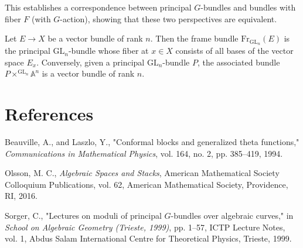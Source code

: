 \documentclass[12pt]{article}
\begin{document}
This establishes a correspondence between principal $G$-bundles and bundles with fiber $F$ (with $G$-action), showing that these two perspectives are equivalent.

\begin{example}
    Let $E \to X$ be a vector bundle of rank $n$. Then the frame bundle $\text{Fr}_{\text{GL}_n}(E)$ is the principal $\text{GL}_n$-bundle whose fiber at $x \in X$ consists of all bases of the vector space $E_x$. Conversely, given a principal $\text{GL}_n$-bundle $P$, the associated bundle $P \times^{\text{GL}_n} \mathbb{A}^n$ is a vector bundle of rank $n$.
\end{example}

\section{References}
\begin{enumerate}
    Beauville, A., and Laszlo, Y.,
    "Conformal blocks and generalized theta functions,"
    \textit{Communications in Mathematical Physics},
    vol. 164, no. 2, pp. 385--419, 1994.

    Olsson, M. C.,
    \textit{Algebraic Spaces and Stacks},
    American Mathematical Society Colloquium Publications, vol. 62,
    American Mathematical Society, Providence, RI, 2016.

    Sorger, C.,
    "Lectures on moduli of principal $G$-bundles over algebraic curves,"
    in \textit{School on Algebraic Geometry (Trieste, 1999)}, pp. 1--57,
    ICTP Lecture Notes, vol. 1, Abdus Salam International Centre for Theoretical Physics, Trieste, 1999.
\end{enumerate}
\end{document}
